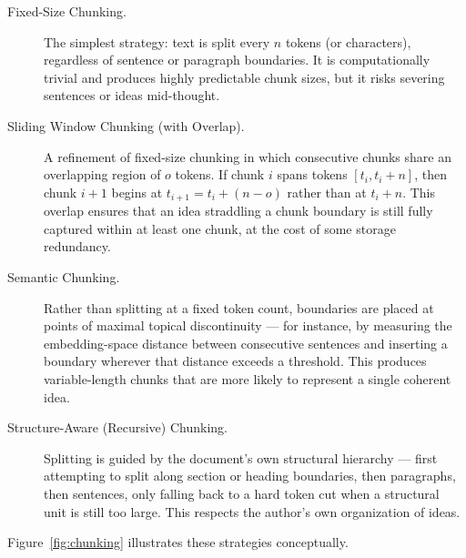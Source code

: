 \documentclass[11pt,a4paper]{article}
\begin{document}
\begin{description}
  \item[Fixed-Size Chunking.] The simplest strategy: text is split every $n$ tokens (or characters), regardless of sentence or paragraph boundaries. It is computationally trivial and produces highly predictable chunk sizes, but it risks severing sentences or ideas mid-thought.
  \item[Sliding Window Chunking (with Overlap).] A refinement of fixed-size chunking in which consecutive chunks share an overlapping region of $o$ tokens. If chunk $i$ spans tokens $[t_i, t_i + n]$, then chunk $i+1$ begins at $t_{i+1} = t_i + (n - o)$ rather than at $t_i + n$. This overlap ensures that an idea straddling a chunk boundary is still fully captured within at least one chunk, at the cost of some storage redundancy.
  \item[Semantic Chunking.] Rather than splitting at a fixed token count, boundaries are placed at points of maximal topical discontinuity --- for instance, by measuring the embedding-space distance between consecutive sentences and inserting a boundary wherever that distance exceeds a threshold. This produces variable-length chunks that are more likely to represent a single coherent idea.
  \item[Structure-Aware (Recursive) Chunking.] Splitting is guided by the document's own structural hierarchy --- first attempting to split along section or heading boundaries, then paragraphs, then sentences, only falling back to a hard token cut when a structural unit is still too large. This respects the author's own organization of ideas.
\end{description}

Figure~\ref{fig:chunking} illustrates these strategies conceptually.
\end{document}
